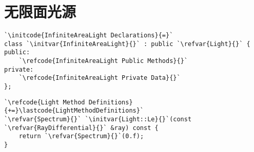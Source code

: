 \section{无限面光源}\label{sec:无限面光源}

\begin{lstlisting}
`\initcode{InfiniteAreaLight Declarations}{=}`
class `\initvar{InfiniteAreaLight}{}` : public `\refvar{Light}{}` {
public:
    `\refcode{InfiniteAreaLight Public Methods}{}`
private:
    `\refcode{InfiniteAreaLight Private Data}{}`
};
\end{lstlisting}
\begin{lstlisting}
`\refcode{Light Method Definitions}{+=}\lastcode{LightMethodDefinitions}`
`\refvar{Spectrum}{}` `\initvar{Light::Le}{}`(const `\refvar{RayDifferential}{}` &ray) const {
    return `\refvar{Spectrum}{}`(0.f);
}
\end{lstlisting}